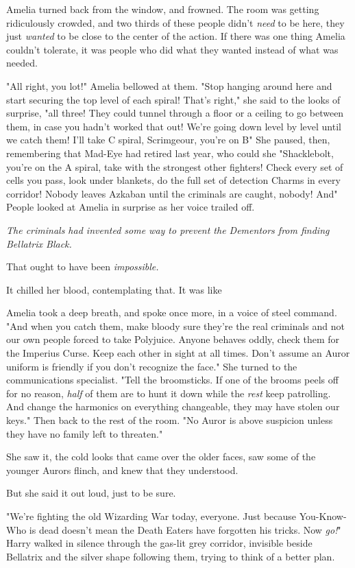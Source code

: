 Amelia turned back from the window, and frowned. The room was getting
ridiculously crowded, and two thirds of these people didn't \emph{need} to be
here, they just \emph{wanted} to be close to the center of the action. If there
was one thing Amelia couldn't tolerate, it was people who did what they wanted
instead of what was needed.

"All right, you lot!" Amelia bellowed at them. "Stop hanging around here and
start securing the top level of each spiral! That's right," she said to the
looks of surprise, "all three! They could tunnel through a floor or a ceiling
to go between them, in case you hadn't worked that out! We're going down level
by level until we catch them! I'll take C spiral, Scrimgeour, you're on
B{\el}" She paused, then, remembering that Mad-Eye had retired last year,
who could she{\el} "Shacklebolt, you're on the A spiral, take with the
strongest other fighters! Check every set of cells you pass, look under
blankets, do the full set of detection Charms in every corridor! Nobody leaves
Azkaban until the criminals are caught, nobody! And{\el}" People looked at
Amelia in surprise as her voice trailed off.

\emph{The criminals had invented some way to prevent the Dementors from finding
Bellatrix Black.}

That ought to have been \emph{impossible.}

It chilled her blood, contemplating that. It was like{\el}

Amelia took a deep breath, and spoke once more, in a voice of steel command.
"And when you catch them, make bloody sure they're the real criminals and not
our own people forced to take Polyjuice. Anyone behaves oddly, check them for
the Imperius Curse. Keep each other in sight at all times. Don't assume an
Auror uniform is friendly if you don't recognize the face." She turned to the
communications specialist. "Tell the broomsticks. If one of the brooms peels
off for no reason, \emph{half} of them are to hunt it down while the
\emph{rest} keep patrolling. And change the harmonics on everything changeable,
they may have stolen our keys." Then back to the rest of the room. "No Auror is
above suspicion unless they have no family left to threaten."

She saw it, the cold looks that came over the older faces, saw some of the
younger Aurors flinch, and knew that they understood.

But she said it out loud, just to be sure.

"We're fighting the old Wizarding War today, everyone. Just because
You-Know-Who is dead doesn't mean the Death Eaters have forgotten his tricks.
Now \emph{go!}"
\sbreak
Harry walked in silence through the gas-lit grey corridor, invisible beside
Bellatrix and the silver shape following them, trying to think of a better plan.

